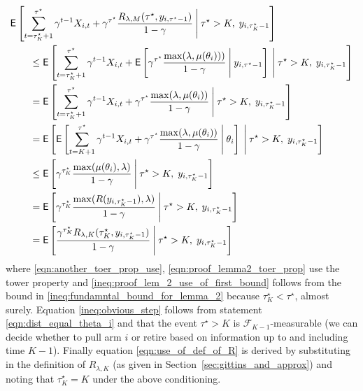 \begin{myproof}[Proof.]
\begin{align}
	&\E\left[\sum_{t=\tau_K^\star+1}^{\tau^\star} \gamma^{t-1} X_{i,t} + \gamma^{\tau^\star} \frac{R_{\lambda,M}(\tau^\star, y_{i,\tau^\star-1})}{1-\gamma}
	\given[\Bigg] \tau^\star > K, \;y_{i,\tau^\star_K-1} \right] \nonumber \\
	&\qquad \le  \E\left[\sum_{t=\tau_K^\star+1}^{\tau^\star} \gamma^{t-1} X_{i,t} +  \Ee{ \gamma^{\tau^\star}\frac{\max(\lambda,\mu(\theta_i)))}{1-\gamma}\given[\Bigg] y_{i,\tau^\star-1}}
	\given[\Bigg] \tau^\star > K, \;y_{i,\tau^\star_K-1} \right] \nonumber\\
	&\qquad = \E\left[\sum_{t=\tau_K^\star+1}^{\tau^\star} \gamma^{t-1} X_{i,t} + \gamma^{\tau^\star} \frac{\max(\lambda, \mu(\theta_i))}{1-\gamma}
	\given[\Bigg] \tau^\star > K, \;y_{i,\tau^\star_K-1} \right] \label{eqn:another_toer_prop_use}\\
	&\qquad = \E\left[ \Ee{\sum_{t=K+1}^{\tau^\star} \gamma^{t-1} X_{i,t} + \gamma^{\tau^\star}\frac{\max(\lambda,\mu(\theta_i))}{1 - \gamma} \given[\Bigg] \theta_i} 
	\given[\Bigg]\tau^\star > K, \; y_{i,\tau^\star_K-1} \right] \label{eqn:proof_lemma2_toer_prop} \\
	&\qquad \le \E\left[ \gamma^{\tau^\star_K} \frac{\max(\mu(\theta_i), \lambda)}{1 - \gamma}\given[\Bigg] \tau^\star > K, \; y_{i,\tau^\star_K-1}  \right]  \label{ineq:proof_lem_2_use_of_first_bound} \\
	&\qquad = \E\left[ \gamma^{\tau^\star_K} \frac{\max(R(y_{i,\tau^\star_K-1}), \lambda)}{1 - \gamma}\given[\Bigg] \tau^\star > K, \; y_{i,\tau^\star_K-1}  \right]  \label{ineq:obvious_step} \\
	&\qquad = \Ee{\frac{\gamma^{\tau^\star_K}R_{\lambda,K}(\tau^\star_K, y_{i,\tau^\star_K-1})}{1-\gamma} \given[\Bigg]  \tau^\star > K, \; y_{i,\tau^\star_K-1}} \label{eqn:use_of_def_of_R}
	\end{align}
	where \eqref{eqn:another_toer_prop_use}, \eqref{eqn:proof_lemma2_toer_prop} use the tower property and \eqref{ineq:proof_lem_2_use_of_first_bound} follows from the bound in \eqref{ineq:fundamntal_bound_for_lemma_2} because $\tau^\star_K < \tau^\star$, almost surely. Equation \eqref{ineq:obvious_step} follows from statement \eqref{eqn:dist_equal_theta_i} and that the event $\tau^\star > K$ is $\mathcal{F}_{K-1}$-measurable (we can decide whether to pull arm $i$ or retire based on information up to and including time $K-1$). Finally equation \eqref{eqn:use_of_def_of_R} is derived by substituting in the definition of $R_{\lambda,K}$ (as given in Section~\ref{sec:gittins_and_approx}) and noting that $\tau^\star_K = K$ under the above conditioning.
	

\end{myproof}
